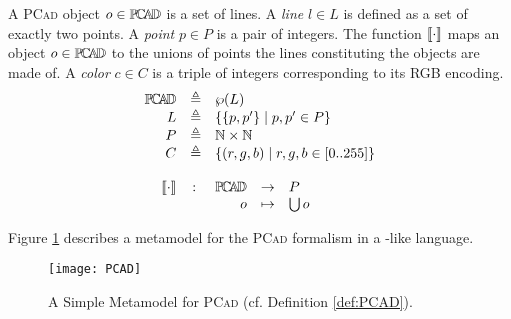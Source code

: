 \begin{Definition}
   A \textsc{PCad} object $o\in \mathbb{P}\!\mathbb{C}\!\mathbb{A}\!\mathbb{D} $ is a set of lines. A \emph{line} $l 
\in L$ is defined as a set of exactly two points. A \emph{point} $p\in P$ is a 
pair of integers. The function $\llbracket \cdot \rrbracket$ maps an object $o\in \mathbb{P}\!\mathbb{C}\!\mathbb{A}\!\mathbb{D} $ to the 
unions of points the lines constituting the objects are made of. A \emph{color} 
$c\in C$ is a triple of integers corresponding to its RGB encoding.
\begin{displaymath}
   \begin{array}{rcl}
      \PCAD &\eqdef& \wp(L)\\
      L     &\eqdef& \{ \{p, p'\} \;|\; p, p' \in P \}\\
      P     &\eqdef& \mathbb{N} \times \mathbb{N}\\
      C     &\eqdef& \{ (r, g, b) \;|\; r, g, b \in [0..255] \}\\
      \\
      \SMapping & \colon & \!\!\!\begin{array}[t]{rcl}
         \PCAD &\to& P\\
         o &\mapsto& \bigcup o
      \end{array}
   \end{array}
\end{displaymath}
\end{Definition}
Figure \ref{fig:PCAD} describes a metamodel for the \textsc{PCad} formalism in 
a \MOF-like language. 

\begin{figure}[t]
   \centering
   \texttt{[image: PCAD]}
   \caption{A Simple Metamodel for \textsc{PCad} (cf. Definition 
\ref{def:PCAD}).}%
   \label{fig:PCAD}%
\end{figure}



